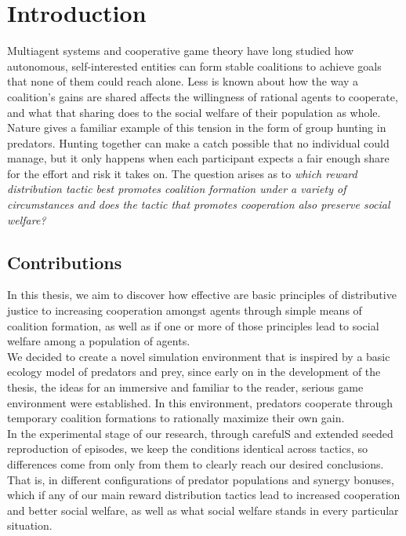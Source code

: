 \documentclass[12pt,a4paper]{report}
\begin{document}
	\chapter{Introduction}
	\label{ch:intro}
	Multiagent systems \cite{Wooldridge2009} and cooperative game theory \cite{Chalkiadakis2011} have long studied how autonomous, self-interested entities can form stable coalitions to achieve goals that none of them could reach alone. Less is known about how the way a coalition's gains are shared affects the willingness of rational agents to cooperate, and what that sharing does to the social welfare of their population as whole. Nature gives a familiar example of this tension in the form of group hunting in predators. Hunting together can make a catch possible that no individual could manage, but it only happens when each participant expects a fair enough share for the effort and risk it takes on. The question arises as to \textit{which reward distribution tactic best promotes coalition formation under a variety of circumstances and does the tactic that promotes cooperation also preserve social welfare?} \\
	
	\section{Contributions}
	In this thesis, we aim to discover how effective are basic principles of distributive justice \cite{Deutsch1975} to increasing cooperation amongst agents through simple means of coalition formation, as well as if one or more of those principles lead to social welfare among a population of agents. \\

	We decided to create a novel simulation environment that is inspired by a basic ecology model of predators and prey, since early on in the development of the thesis, the ideas for an immersive and familiar to the reader, serious game environment were established. In this environment, predators cooperate through temporary coalition formations to rationally maximize their own gain. \\

	In the experimental stage of our research, through carefulS and extended seeded reproduction of episodes, we keep the conditions identical across tactics, so differences come from only from them to clearly reach our desired conclusions. That is, in different configurations of predator populations and synergy bonuses, which if any of our main reward distribution tactics lead to increased cooperation and better social welfare, as well as what social welfare stands in every particular situation. \\
\end{document}
